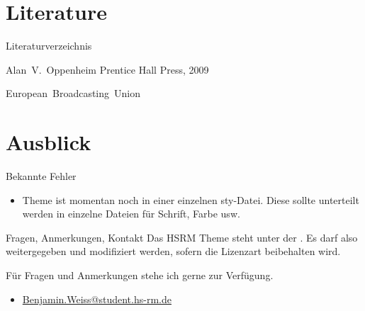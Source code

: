 \section{Literature}
\begin{frame}{Literaturverzeichnis}
	\begin{thebibliography}{10}
    
	\beamertemplatebookbibitems
	Alan~V.~Oppenheim
	\newblock {}
	\newblock Prentice Hall Press, 2009

	\beamertemplatearticlebibitems
	European~Broadcasting~Union
	\newblock {}
  \end{thebibliography}
\end{frame}

\section{Ausblick}
\begin{frame}{Bekannte Fehler}
	\begin{itemize}
		\item Theme ist momentan noch in einer einzelnen sty-Datei. Diese sollte unterteilt werden in einzelne Dateien für Schrift, Farbe usw.
	\end{itemize}
\end{frame}

\begin{frame}{Fragen, Anmerkungen, Kontakt}
	Das HSRM Theme steht unter der . Es darf also weitergegeben und modifiziert werden, sofern die Lizenzart beibehalten wird.
	
	Für Fragen und Anmerkungen stehe ich gerne zur Verfügung.
	\begin{itemize}
		\item \url{Benjamin.Weiss@student.hs-rm.de}
	\end{itemize}
\end{frame}
